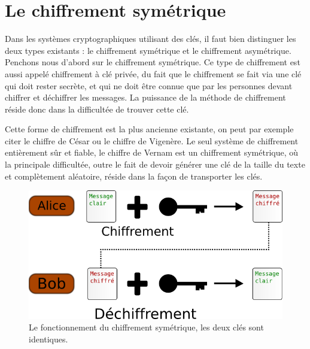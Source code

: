 \section{Le chiffrement symétrique}
Dans les systèmes cryptographiques utilisant des clés, il faut bien
distinguer les deux types existants : le chiffrement symétrique et le
chiffrement asymétrique. Penchons nous d'abord sur le chiffrement
symétrique. Ce type de chiffrement est aussi appelé chiffrement à clé
privée, du fait que le chiffrement se fait via une clé qui doit rester
secrète, et qui ne doit être connue que par les personnes devant
chiffrer et déchiffrer les messages. La puissance de la méthode de
chiffrement réside donc dans la difficultée de trouver cette
clé. 

Cette forme de chiffrement est la plus ancienne existante, on peut par
exemple citer le chiffre de César ou le chiffre de Vigenère. Le seul
système de chiffrement entièrement sûr et fiable, le chiffre de Vernam
est un chiffrement symétrique, où la principale difficultée, outre le
fait de devoir générer une clé de la taille du texte et complètement
aléatoire, réside dans la façon de transporter les clés.

\begin{figure}[h]
  \begin{center}
    \includegraphics[scale=0.5]{images/ChiffrementSymetrique.png}
  \end{center}
  \caption{Le fonctionnement du chiffrement symétrique, les deux clés
    sont identiques.}
  \label{fig:ChiffrementSymetrique}
\end{figure}

